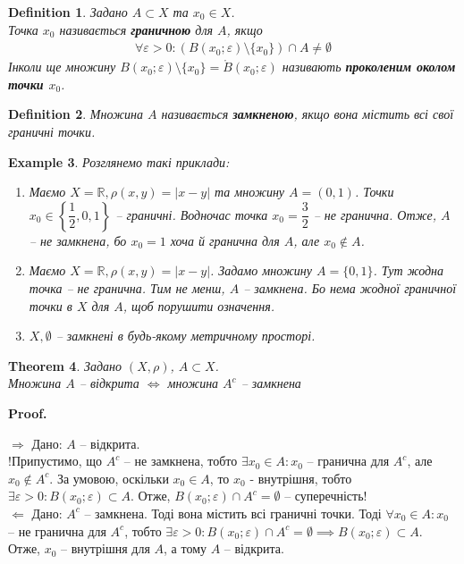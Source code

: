 \documentclass[a4paper, 10pt]{article}
\makeatletter
\def\rightproof{$\boxed{\Rightarrow}$ }
\def\leftproof{$\boxed{\Leftarrow}$ }
\theoremstyle{theoremdd}
\newtheorem{theorem}{Theorem}[subsection]
\theoremstyle{theoremdd}
\newtheorem{definition}[theorem]{Definition}
\theoremstyle{theoremdd}
\theoremstyle{theoremdd}
\newtheorem{example}[theorem]{Example}
\theoremstyle{theoremdd}
\theoremstyle{theoremdd}
\theoremstyle{theoremdd}
\theoremstyle{theoremdd}
\renewenvironment{proof}[1][Proof.\\]{\par
\pushQED{\hfill \qed}%
\normalfont \topsep6\p@\@plus6\p@\relax
\trivlist
\item\relax
{\bfseries
#1\@addpunct{.}}\hspace\labelsep\ignorespaces
}{%
\popQED\endtrivlist\@endpefalse
}
\makeatother
\begin{document}
\begin{definition}
Задано $A \subset X$ та $x_0 \in X$.\\
Точка $x_0$ називається \textbf{граничною} для $A$, якщо
\begin{align*}
\forall \varepsilon > 0: (B(x_0;\varepsilon) \setminus \{x_0\}) \cap A \neq \emptyset
\end{align*}
Інколи ще множину $B(x_0;\varepsilon) \setminus \{x_0\} = \mathring{B}(x_0;\varepsilon)$ називають \textbf{проколеним околом точки $x_0$}.
\end{definition}

\begin{definition}
Множина $A$ називається \textbf{замкненою}, якщо вона містить всі свої граничні точки.
\end{definition}

\begin{example}
Розглянемо такі приклади:
\begin{enumerate}[wide=0pt,label={\arabic*)}]
\item Маємо $X = \mathbb{R}, \rho(x,y) = |x-y|$ та множину $A = (0,1)$. Точки $x_0 \in \left\{\dfrac{1}{2}, 0, 1\right\}$ -- граничні. Водночас точка $x_0 = \dfrac{3}{2}$ -- не гранична. Отже, $A$ -- не замкнена, бо $x_0 = 1$ хоча й гранична для $A$, але $x_0 \notin A$.
\item Маємо $X = \mathbb{R}, \rho(x,y) = |x-y|$. Задамо множину $A = \{0,1 \}$. Тут жодна точка -- не гранична. Тим не менш, $A$ -- замкнена. Бо нема жодної граничної точки в $X$ для $A$, щоб порушити означення.
\item $X, \emptyset$ -- замкнені в будь-якому метричному просторі.
\end{enumerate}
\end{example}

\begin{theorem}
Задано $(X,\rho)$, $A \subset X$.\\
Множина $A$ -- відкрита $\iff$ множина $A^c$ -- замкнена
\end{theorem}

\begin{proof}
\rightproof Дано: $A$ -- відкрита.\\
!Припустимо, що $A^c$ -- не замкнена, тобто $\exists x_0 \in A: x_0$ -- гранична для $A^c$, але $x_0 \notin A^c$. За умовою, оскільки $x_0 \in A$, то $x_0$ - внутрішня, тобто $\exists \varepsilon > 0: B(x_0;\varepsilon) \subset A$. Отже, $B(x_0;\varepsilon) \cap A^c = \emptyset$ -- суперечність!
\bigskip \\
\leftproof Дано: $A^c$ -- замкнена. Тоді вона містить всі граничні точки. Тоді $\forall x_0 \in A: x_0$ -- не гранична для $A^c$, тобто $\exists \varepsilon > 0: B(x_0;\varepsilon) \cap A^c = \emptyset \implies B(x_0;\varepsilon) \subset A$. Отже, $x_0$ -- внутрішня для $A$, а тому $A$ -- відкрита.
\end{proof}
\end{document}
